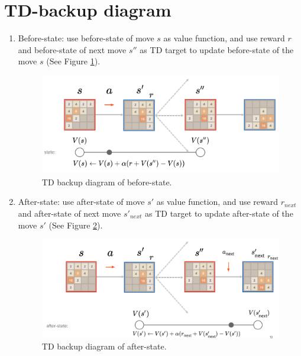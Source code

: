 \section{TD-backup diagram}
\begin{enumerate}
	\item Before-state: use before-state of move $s$ as value function, and use 
	reward $r$ and before-state of next move $s''$ as TD target to update before-state of the move $s$
	(See Figure \ref{td-backup-before-state}).
	\begin{figure}[H]
		\centering
		\includegraphics[scale=0.5]{img/td-backup-before-state.png}
		\caption{TD backup diagram of before-state.}
		\label{td-backup-before-state}
	\end{figure}
	\item After-state: use after-state of move $s'$ as value function, and use 
	reward $r_{next}$ and after-state of next move $s'_{next}$ as TD target to update after-state of the move $s'$
	(See Figure \ref{td-backup-after-state}).
	\begin{figure}[H]
		\centering
		\includegraphics[scale=0.5]{img/td-backup-after-state.png}
		\caption{TD backup diagram of after-state.}
		\label{td-backup-after-state}
	\end{figure}
\end{enumerate}

\pagebreak
